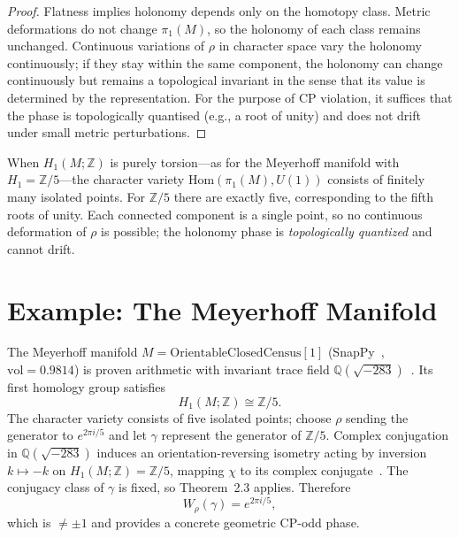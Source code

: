 \documentclass[epjc3]{svjour3}
\begin{document}
\begin{proof}
Flatness implies holonomy depends only on the homotopy class.
Metric deformations do not change $\pi_1(M)$, so the holonomy of each class
remains unchanged.  Continuous variations of $\rho$ in character space
vary the holonomy continuously; if they stay within the same component,
the holonomy can change continuously but remains a topological invariant
in the sense that its value is determined by the representation.
For the purpose of CP violation, it suffices that the phase is
topologically quantised (e.g., a root of unity) and does not drift
under small metric perturbations.
\end{proof}

\begin{remark}
When $H_1(M;\mathbb{Z})$ is purely torsion---as for the Meyerhoff
manifold with $H_1=\mathbb{Z}/5$---the character variety
$\mathrm{Hom}(\pi_1(M),U(1))$ consists of finitely many isolated points.
For $\mathbb{Z}/5$ there are exactly five, corresponding to the fifth
roots of unity.  Each connected component is a single point, so no
continuous deformation of $\rho$ is possible; the holonomy phase is
\emph{topologically quantized} and cannot drift.
\end{remark}

\section{Example: The Meyerhoff Manifold}

The Meyerhoff manifold $M=\mathrm{OrientableClosedCensus}[1]$
(SnapPy~\cite{SnapPy}, $\mathrm{vol}=0.9814$) is proven arithmetic
with invariant trace field $\mathbb{Q}(\sqrt{-283})$~\cite{Chinburg98}.
Its first homology group satisfies
\[
H_1(M;\mathbb{Z}) \cong \mathbb{Z}/5.
\]
The character variety consists of five isolated points; choose $\rho$
sending the generator to $e^{2\pi i/5}$ and let $\gamma$ represent the
generator of $\mathbb{Z}/5$.
Complex conjugation in $\mathbb{Q}(\sqrt{-283})$ induces an
orientation-reversing isometry acting by inversion
$k\mapsto -k$ on $H_1(M;\mathbb{Z})=\mathbb{Z}/5$,
mapping $\chi$ to its complex conjugate~\cite{MaclachlanReid,Chinburg98}.
The conjugacy class of $\gamma$ is fixed, so Theorem~2.3 applies.
Therefore
\[
W_\rho(\gamma) = e^{2\pi i/5},
\]
which is $\neq \pm 1$ and provides a concrete geometric CP-odd phase.
\end{document}

